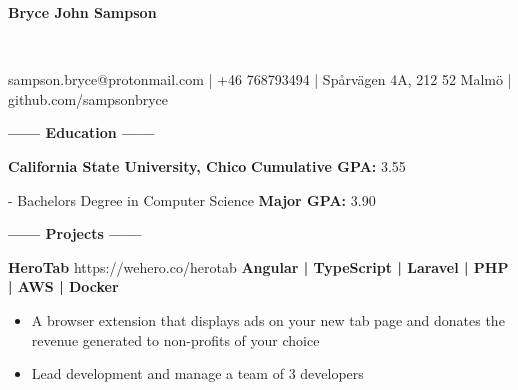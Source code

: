 \documentclass[12pt]{article}
\begin{document}
\sffamily
\lsstyle
\color{white}
\center
\begin{Huge}\textbf{Bryce John Sampson}\end{Huge}\\
\medskip
\fontsize{12}{1.2}
\selectfont
\smallbreak
\begin{accentbox}
        \centering
        \color{secondary}
        sampson.bryce@protonmail.com | +46 768793494 | Spårvägen 4A, 212 52 Malmö | github.com/sampsonbryce
    
\end{accentbox}
\smallskip
\center
\textbf{\Large------ Education ------}\\
    \vspace{-2mm}

\flushleft
\begin{footnotesize}
\textbf{\color{primary}\large California State University, Chico}
\hfill
\textbf{\color{Cerulean}Cumulative GPA: }3.55\\

\smallskip
\begin{addmargin}[2em]{0em}

- Bachelors Degree in Computer Science
\hfill
\textbf{\color{Cerulean}Major GPA: }3.90\\
\end{addmargin}

\smallskip

\end{footnotesize}

    \color{white}
    \vspace{-2mm}

    \begin{center}
    \textbf{\Large------ Projects ------}\\
    \end{center}
    
    \vspace{-2mm}
    \begin{footnotesize}

    \textbf{\color{primary}\large HeroTab }{\color{primary}\footnotesize https://wehero.co/herotab} \hfill \textbf{\color{Cerulean}Angular | TypeScript | Laravel | PHP | AWS | Docker}\\
    \begin{itemize}
        \setlength{\itemsep}{0pt}
        \item A browser extension that displays ads on your new tab page and donates the revenue generated to non-profits of your choice
        \item Lead development and manage a team of 3 developers
    \end{itemize}

    \end{footnotesize}
\end{document}
